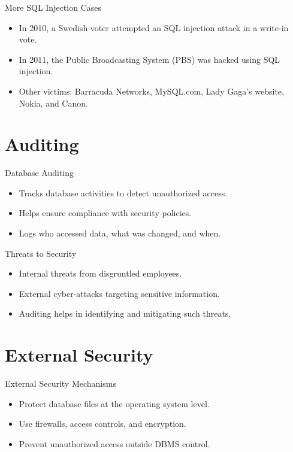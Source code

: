 \documentclass{beamer}
\begin{document}
\begin{frame}{More SQL Injection Cases}
    \begin{itemize}
        \item In 2010, a Swedish voter attempted an SQL injection attack in a write-in vote.
        \item In 2011, the Public Broadcasting System (PBS) was hacked using SQL injection.
        \item Other victims: Barracuda Networks, MySQL.com, Lady Gaga’s website, Nokia, and Canon.
    \end{itemize}
\end{frame}

\section{Auditing}

\begin{frame}{Database Auditing}
    \begin{itemize}
        \item Tracks database activities to detect unauthorized access.
        \item Helps ensure compliance with security policies.
        \item Logs who accessed data, what was changed, and when.
    \end{itemize}
\end{frame}

\begin{frame}{Threats to Security}
    \begin{itemize}
        \item Internal threats from disgruntled employees.
        \item External cyber-attacks targeting sensitive information.
        \item Auditing helps in identifying and mitigating such threats.
    \end{itemize}
\end{frame}

\section{External Security}

\begin{frame}{External Security Mechanisms}
    \begin{itemize}
        \item Protect database files at the operating system level.
        \item Use firewalls, access controls, and encryption.
        \item Prevent unauthorized access outside DBMS control.
    \end{itemize}
\end{frame}
\end{document}

